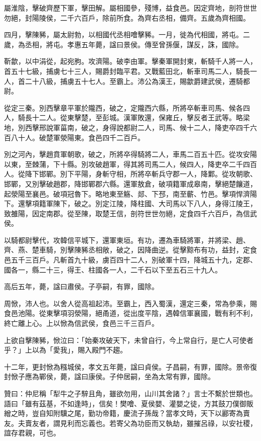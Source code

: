 \begin{pinyinscope}
屬淮陰，擊破齊歷下軍，擊田解。屬相國參，殘博，益食邑。因定齊地，剖符世世勿絕，封陽陵侯，二千六百戶，除前所食。為齊右丞相，備齊。五歲為齊相國。

四月，擊陳豨，屬太尉勃，以相國代丞相噲擊豨。一月，徙為代相國，將屯。二歲，為丞相，將屯。孝惠五年薨，諡曰景侯。傳至曾孫偃，謀反，誅，國除。

靳歙，以中涓從，起宛朐。攻濟陽。破李由軍。擊秦軍開封東，斬騎千人將一人，首五十七級，捕虜七十三人，賜爵封臨平君。又戰藍田北，斬車司馬二人，騎長一人，首二十八級，捕虜五十七人。至霸上。沛公為漢王，賜歙爵建武侯，遷騎都尉。

從定三秦。別西擊章平軍於隴西，破之，定隴西六縣，所將卒斬車司馬、候各四人，騎長十二人。從東擊楚，至彭城。漢軍敗還，保雍丘，擊反者王武等。略梁地，別西擊邢說軍菑南，破之，身得說都尉二人，司馬、候十二人，降吏卒四千六百八十人。破楚軍滎陽東。食邑四千二百戶。

別之河內，擊趙賁軍朝歌，破之，所將卒得騎將二人，車馬二百五十匹。從攻安陽以東，至棘蒲，下十縣。別攻破趙軍，得其將司馬二人，候四人，降吏卒二千四百人。從降下邯鄲。別下平陽，身斬守相，所將卒斬兵守郡一人，降鄴。從攻朝歌、邯鄲，又別擊破趙郡，降邯鄲郡六縣。還軍敖倉，破項籍軍成皋南，擊絕楚饟道，起滎陽至襄邑。破項冠魯下。略地東至觞、郯、下邳，南至蘄、竹邑。擊項悍濟陽下。還擊項籍軍陳下，破之。別定江陵，降柱國、大司馬以下八人，身得江陵王，致雒陽，因定南郡。從至陳，取楚王信，剖符世世勿絕，定食四千六百戶，為信武侯。

以騎都尉擊代，攻韓信平城下，還軍東垣。有功，遷為車騎將軍，并將梁、趙、齊、燕、楚車騎，別擊陳豨丞相敞，破之，因降曲逆。從擊黥布有功，益封，定食邑五千三百戶。凡斬首九十級，虜百四十二人，別破軍十四，降城五十九，定郡、國各一，縣二十三，得王、柱國各一人，二千石以下至五石三十九人。

高后五年，薨，諡曰肅侯。子亭嗣，有罪，國除。

周惞，沛人也。以舍人從高祖起沛。至霸上，西入蜀漢，還定三秦，常為參乘，賜食邑池陽。從東擊項羽滎陽，絕甬道，從出度平陰，遇韓信軍襄國，戰有利不利，終亡離上心。上以惞為信武侯，食邑三千三百戶。

上欲自擊陳豨，惞泣曰：「始秦攻破天下，未曾自行，今上常自行，是亡人可使者乎？」上以為「愛我」，賜入殿門不趨。

十二年，更封惞為糨城侯，孝文五年薨，諡曰貞侯。子昌嗣，有罪，國除。景帝復封惞子應為鄲侯，薨，諡曰康侯。子仲居嗣，坐為太常有罪，國除。

贊曰：仲尼稱「犁牛之子騂且角，雖欲勿用，山川其舍諸？」言士不繫於世類也。語曰「雖有茲基，不如逢時」，信矣！樊噲、夏侯嬰、灌嬰之徒，方其鼓刀僕御販繒之時，豈自知附驥之尾，勤功帝籍，慶流子孫哉？當孝文時，天下以酈寄為賣友。夫賣友者，謂見利而忘義也。若寄父為功臣而又執劫，雖摧呂祿，以安社稷，誼存君親，可也。


\end{pinyinscope}